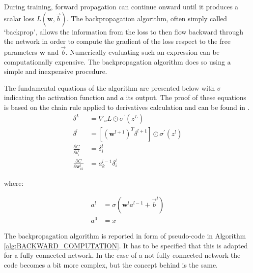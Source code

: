 During training, forward propagation can continue onward until it produces a scalar loss $L(\mathbf{w},\vec{b})$. The backpropagation algorithm, often simply called `backprop', allows the information from the loss to then flow backward through the network in order to compute the gradient of the loss respect to the free parameters $\mathbf{w}$ and $\vec{b}$. Numerically evaluating such an expression can be computationally expensive. The backpropagation algorithm does so using a simple and inexpensive procedure.

The fundamental equations of the algorithm are presented below with $\sigma$ indicating the activation function and $a$ its output\footnotemark. The proof of these equations is based on the chain rule applied to derivatives calculation and can be found in \cite{nielsen}.
\begin{align}
    \delta^L &= \nabla_a L \odot \sigma^{\prime}(z^L)   \\
    \delta^l &= [(\mathbf{w}^{l+1})^T \delta^{l+1}] \odot \sigma^{\prime}(z^{l})    \\
    \frac{\partial C}{\partial b^{l}_{i}} &= \delta^{l}_{i}  \\
    \frac{\partial C}{\partial \mathbf{w}^{l}_{ik}} &= a^{l-1}_{k} \delta^{l}_{i}
\end{align}

\noindent
where:

\begin{align*}
	a^{l} &= \sigma(\mathbf{w}^{l} a^{l-1} + \vec{b}^{l})	\\
	a^{0} &= x
\end{align*}


The backpropagation algorithm is reported in form of pseudo-code in Algorithm \ref{alg:BACKWARD_COMPUTATION}. It has to be specified that this is adapted for a fully connected network. In the case of a not-fully connected network the code becomes a bit more complex, but the concept behind is the same.

